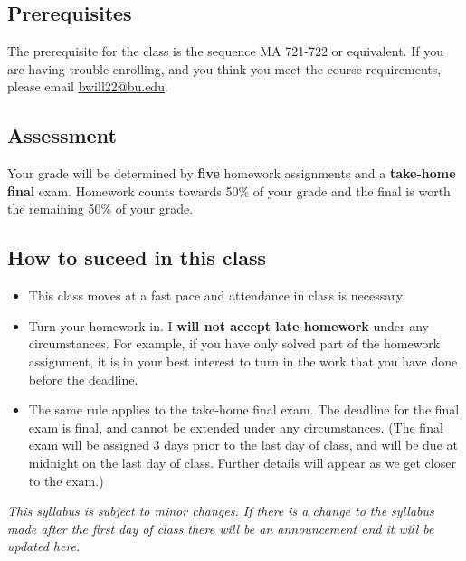 \documentclass[../main.tex]{subfiles}
\begin{document}
\subsection*{Prerequisites}

The prerequisite for the class is the sequence MA 721-722 or equivalent.
If you are having trouble enrolling, and you think you meet the course requirements, please email \url{bwill22@bu.edu}.

\subsection*{Assessment}

Your grade will be determined by \textbf{five} homework assignments and a \textbf{take-home final} exam. 
Homework counts towards 50\% of your grade and the final is worth the remaining 50\% of your grade.

\subsection*{How to suceed in this class}
\begin{itemize}
  \item This class moves at a fast pace and attendance in class is necessary. 
  \item Turn your homework in. I \textbf{will not accept late homework} under any circumstances.
      For example, if you have only solved part of the homework assignment, it is in your best interest to turn in the
      work that you have done
      before the deadline.
    \item The same rule applies to the take-home final exam.
      The deadline for the final exam is final, and cannot be extended under any circumstances. (The final exam will be
      assigned 3 days prior to the last day of class, and will be due at midnight on the last day of class. Further
      details will appear as we get closer to the exam.) 
\end{itemize}


\begin{center}
  \textit{This syllabus is subject to minor changes. 
    If there is a change to the syllabus made after the first day
    of class there will be an
    announcement and it will be updated here.}
  \end{center}
\end{document}
